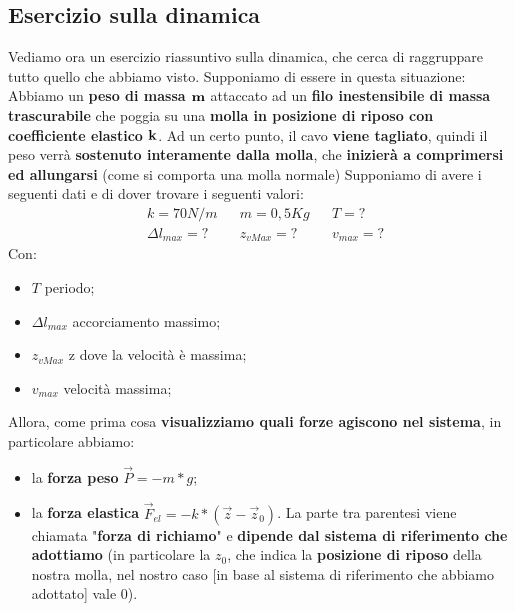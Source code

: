     \subsection{Esercizio sulla dinamica}\label{esercizioDinamicaMolla}
        Vediamo ora un esercizio riassuntivo sulla dinamica, che cerca di raggruppare tutto quello che abbiamo visto. Supponiamo di essere in questa situazione:
        Abbiamo un \textbf{peso di massa $\bf{m}$} attaccato ad un \textbf{filo inestensibile di massa trascurabile} che poggia su una \textbf{molla in posizione di riposo con coefficiente elastico $\bf{k}$}. Ad un certo punto, il cavo \textbf{viene tagliato}, quindi il peso verrà \textbf{sostenuto interamente dalla molla}, che \textbf{inizierà a comprimersi ed allungarsi} (come si comporta una molla normale)
        Supponiamo di avere i seguenti dati e di dover trovare i seguenti valori:
        \begin{align*}
            & k = 70 N/m&& m = 0,5 Kg && T = ?\\
            &\Delta l_{max} = ? && z_{vMax}=? && v_{max}=?
        \end{align*}
        Con:
        \begin{itemize}
            \item $T$ periodo;
            \item $\Delta l_{max}$ accorciamento massimo;
            \item $z_{vMax}$ z dove la velocità è massima;
            \item $v_{max}$ velocità massima;
        \end{itemize}
        Allora, come prima cosa \textbf{visualizziamo quali forze agiscono nel sistema}, in particolare abbiamo:
        \begin{itemize}
            \item la \textbf{forza peso} $\vec{P}=-m*g$;
            \item la \textbf{forza elastica} $\vec{F}_{el}=-k*(\vec{z}-\vec{z}_0)$. La parte tra parentesi viene chiamata "\textbf{forza di richiamo}" e \textbf{dipende dal sistema di riferimento che adottiamo} (in particolare la $z_0$, che indica la \textbf{posizione di riposo} della nostra molla, nel nostro caso [in base al sistema di riferimento che abbiamo adottato] vale 0).
        \end{itemize}


